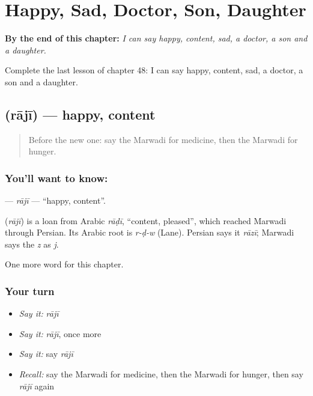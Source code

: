 
\chapter{Happy, Sad, Doctor, Son, Daughter}
\label{ch:mw-happy-sad-doctor-son-daughter}

\begin{chapteropening}
\textbf{By the end of this chapter:} \emph{I can say happy, content, sad, a doctor, a son and a daughter.}

Complete the last lesson of chapter 48: I can say happy, content, sad, a doctor, a son and a daughter.
\end{chapteropening}

\section[\texorpdfstring{\mw{राजी} (rājī)}{राजी (rājī)}]{ (rājī) — happy, content}

\label{lesson:MW-C48-raji}



\begin{quote}
Before the new one: say the Marwadi for medicine, then the Marwadi for hunger.
\end{quote}

\subsection*{You'll want to know: }
\textbf{} — \emph{rājī} — \textquotedblleft{}happy, content\textquotedblright{}.

\begin{cousinweb}
\textbf{} (\emph{rājī}) is a loan from Arabic \emph{rāḍī}, \textquotedblleft{}content, pleased\textquotedblright{}, which reached Marwadi through Persian. Its Arabic root is \emph{r-ḍ-w} (Lane). Persian says it \emph{rāzī}; Marwadi says the \emph{z} as \emph{j}.
\end{cousinweb}

\begin{grammarlens}[title={What you've built}]
One more word for this chapter.
\end{grammarlens}

\subsection*{Your turn}
\begin{itemize}
\raggedright
  \item \emph{Say it:} \emph{rājī}
  \item \emph{Say it:} \emph{rājī}, once more
  \item \emph{Say it:} say \emph{rājī}
  \item \emph{Recall:} say the Marwadi for medicine, then the Marwadi for hunger, then say \emph{rājī} again
\end{itemize}

